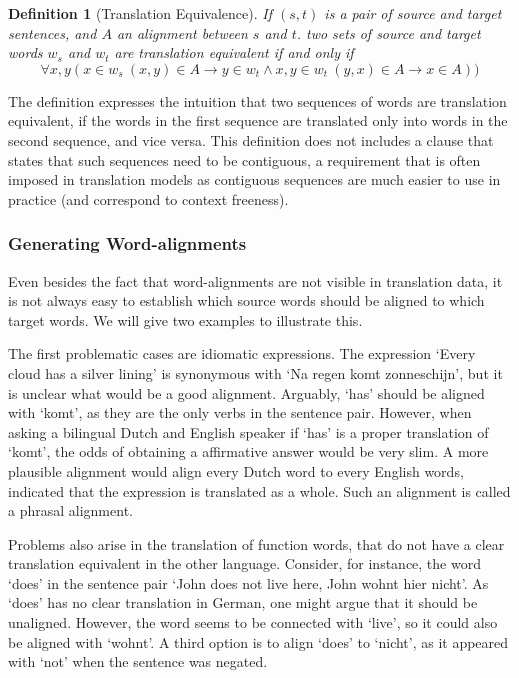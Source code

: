 \documentclass{report}
\theoremstyle{break}
\newtheorem{definition}{Definition}
\begin{document}
\begin{definition}[Translation Equivalence]
If $(s,t)$ is a pair of source and target sentences, and $A$ an alignment between $s$ and $t$. two sets of source and target words $w_s$ and $w_t$ are translation equivalent if and only if $$\forall x,y ( x\in w_s~(x,y)\in A \rightarrow y\in w_t \land x,y \in w_t~(y,x)\in A \rightarrow x\in A))$$
\end{definition}

The definition expresses the intuition that two sequences of words are translation equivalent, if the words in the first sequence are translated only into words in the second sequence, and vice versa. This definition does not includes a clause that states that such sequences need to be contiguous, a requirement that is often imposed in translation models as contiguous sequences are much easier to use in practice (and correspond to context freeness).

\subsubsection{Generating Word-alignments}

Even besides the fact that word-alignments are not visible in translation data, it is not always easy to establish which source words should be aligned to which target words. We will give two examples to illustrate this.

The first problematic cases are idiomatic expressions. The expression `Every cloud has a silver lining'  is synonymous with `Na regen komt zonneschijn', but it is unclear what would be a good alignment. Arguably, `has' should be aligned with `komt', as they are the only verbs in the sentence pair. However, when asking a bilingual Dutch and English speaker if `has' is a proper translation of `komt', the odds of obtaining a affirmative answer would be very slim. A more plausible alignment would align every Dutch word to every English words, indicated that the expression is translated as a whole. Such an alignment is called a phrasal alignment.

Problems also arise in the translation of function words, that do not have a clear translation equivalent in the other language. Consider, for instance, the word `does' in the sentence pair `John does not live here, John wohnt hier nicht'. As `does' has no clear translation in German, one might argue that it should be unaligned. However, the word seems to be connected with `live', so it could also be aligned with `wohnt'. A third option is to align `does' to `nicht', as it appeared with `not' when the sentence was negated.\citep[Example from][p.114]{koehn2008statistical}
\end{document}

